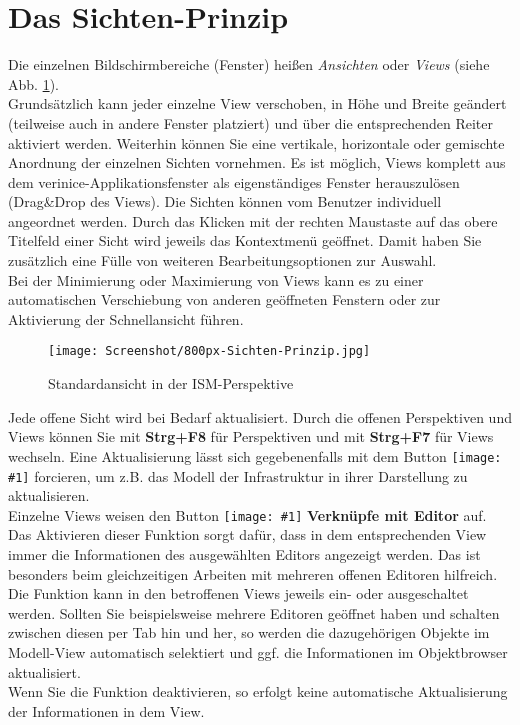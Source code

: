 \documentclass[a4paper,10pt]{book}
\newcommand{\icon}[1]{\texttt{[image: \#1]}}
\begin{document}
\section{Das Sichten-Prinzip}
Die einzelnen Bildschirmbereiche (Fenster) heißen {\em Ansichten} oder {\em Views} (siehe Abb. \ref{Standardansicht in der ISM-Perspektive}).
\newline\\
Grundsätzlich kann jeder einzelne View verschoben, in Höhe und Breite geändert (teilweise auch in andere Fenster platziert) und über die
entsprechenden Reiter aktiviert werden. Weiterhin können Sie eine vertikale, horizontale oder gemischte Anordnung der einzelnen Sichten
vornehmen. Es ist möglich, Views komplett aus dem verinice-Applikationsfenster als eigenständiges Fenster herauszulösen (Drag\&Drop des Views).
Die Sichten können vom Benutzer individuell angeordnet werden. Durch das
Klicken mit der rechten Maustaste auf das obere Titelfeld einer Sicht wird jeweils das Kontextmenü geöffnet. Damit haben Sie zusätzlich
eine Fülle von weiteren Bearbeitungsoptionen zur Auswahl.
\newline\\
Bei der Minimierung oder Maximierung von Views kann es zu einer automatischen Verschiebung von anderen geöffneten Fenstern
oder zur Aktivierung der Schnellansicht führen.
\begin{figure}[htb!]
  \centering
  \texttt{[image: Screenshot/800px-Sichten-Prinzip.jpg]}
  \caption{\label{Standardansicht in der ISM-Perspektive} Standardansicht in der ISM-Perspektive}
\end{figure}
Jede offene Sicht wird bei Bedarf aktualisiert. Durch die offenen Perspektiven und Views können Sie mit \textbf{Strg+F8} für Perspektiven und mit \textbf{Strg+F7} für Views wechseln.
Eine Aktualisierung lässt sich gegebenenfalls mit dem Button \icon{Icon/Aktualisieren.png} forcieren, um z.B. das Modell der Infrastruktur in ihrer Darstellung zu aktualisieren.
\newline\\
Einzelne Views weisen den Button \icon{Icon/Verinice_linked.png} \textbf{Verknüpfe mit Editor} auf.
Das Aktivieren dieser Funktion sorgt dafür, dass in dem entsprechenden View immer die Informationen des ausgewählten Editors
angezeigt werden. Das ist besonders beim gleichzeitigen Arbeiten mit mehreren offenen Editoren hilfreich. Die Funktion kann in
den betroffenen Views jeweils ein- oder ausgeschaltet werden. Sollten Sie beispielsweise mehrere Editoren geöffnet haben und
schalten zwischen diesen per Tab hin und her, so werden die dazugehörigen Objekte im Modell-View automatisch selektiert und
ggf. die Informationen im Objektbrowser aktualisiert.
\newline\\
Wenn Sie die Funktion deaktivieren, so erfolgt keine automatische Aktualisierung der Informationen in dem View.
\end{document}
